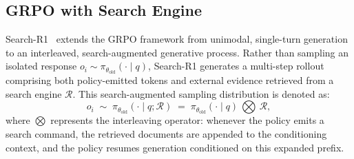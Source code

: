 \subsection{GRPO with Search Engine}

Search-R1~\citep{jin2025searchr1trainingllmsreason} extends the GRPO framework from unimodal, single-turn generation to an interleaved, search-augmented generative process. Rather than sampling an isolated response $o_i \sim \pi_{\theta_{\text{old}}}(\cdot \mid q)$, Search-R1 generates a multi-step rollout comprising both policy-emitted tokens and external evidence retrieved from a search engine $\mathcal{R}$. This search-augmented sampling distribution is denoted as:
\begin{equation}
    o_i \;\sim\; \pi_{\theta_{\text{old}}}(\cdot \mid q; \mathcal{R}) \;=\; \pi_{\theta_{\text{old}}}(\cdot \mid q) \,\bigotimes\, \mathcal{R},
\end{equation}
where $\bigotimes$ represents the interleaving operator: whenever the policy emits a search command, the retrieved documents are appended to the conditioning context, and the policy resumes generation conditioned on this expanded prefix.

